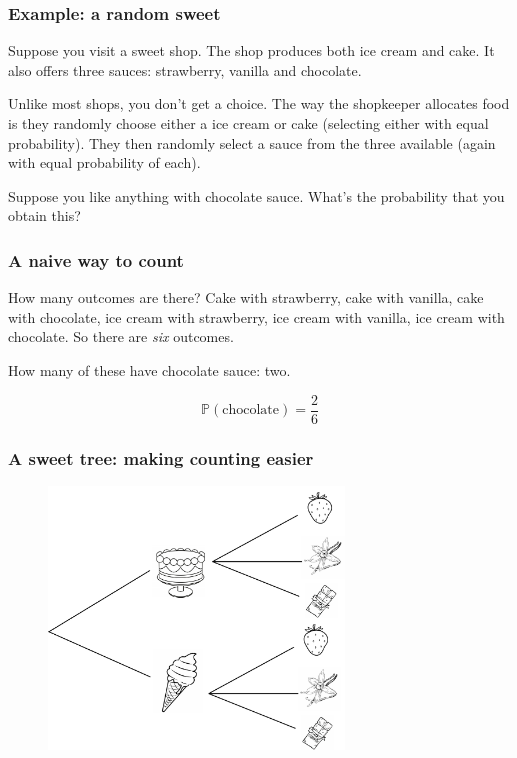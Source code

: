 \documentclass{beamer}
\begin{document}
	\begin{frame}
		\frametitle{Example: a random sweet}
		
		Suppose you visit a sweet shop. The shop produces both ice cream and cake. It also offers three sauces: strawberry, vanilla and chocolate.
		
		\vspace{0.5cm}
		
		Unlike most shops, you don't get a choice. The way the shopkeeper allocates food is they randomly choose either a ice cream or cake (selecting either with equal probability). They then randomly select a sauce from the three available (again with equal probability of each).
		
		\vspace{0.5cm}
		
		Suppose you like anything with chocolate sauce. What's the probability that you obtain this?
		
	\end{frame}

	\begin{frame}
		\frametitle{A naive way to count}
		
		How many outcomes are there? Cake with strawberry, cake with vanilla, cake with chocolate, ice cream with strawberry, ice cream with vanilla, ice cream with chocolate.  So there are \textit{six} outcomes.
		
		\vspace{0.5cm}
		
		How many of these have chocolate sauce: two.
		
		\vspace{0.5cm}
		
		\begin{equation}
			\mathbb{P}(\text{chocolate}) = \frac{2}{6}
		\end{equation}
		
	\end{frame}


	\begin{frame}
		\frametitle{A sweet tree: making counting easier}
		
		\begin{figure}[ht]
			\centerline{\includegraphics[width=0.7\textwidth]{./figures/tree.pdf}}
		\end{figure}
		
	\end{frame}
\end{document}
